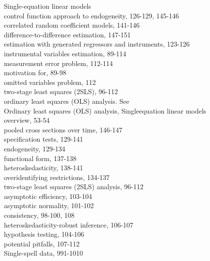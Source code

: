 \documentclass[10pt]{article}
\begin{document}
Single-equation linear models\\
control function approach to endogeneity, 126-129, 145-146\\
correlated random coefficient models, 141-146\\
difference-to-difference estimation, 147-151\\
estimation with generated regressors and instruments, 123-126\\
instrumental variables estimation, 89-114\\
measurement error problem, 112-114\\
motivation for, 89-98\\
omitted variables problem, 112\\
two-stage least squares (2SLS), 96-112\\
ordinary least squares (OLS) analysis. See\\
Ordinary least squares (OLS) analysis, Singleequation linear models\\
overview, 53-54\\
pooled cross sections over time, 146-147\\
specification tests, 129-141\\
endogeneity, 129-134\\
functional form, 137-138\\
heteroskedasticity, 138-141\\
overidentifying restrictions, 134-137\\
two-stage least squares (2SLS) analysis, 96-112\\
asymptotic efficiency, 103-104\\
asymptotic normality, 101-102\\
consistency, 98-100, 108\\
heteroskedasticity-robust inference, 106-107\\
hypothesis testing, 104-106\\
potential pitfalls, 107-112\\
Single-spell data, 991-1010
\end{document}
